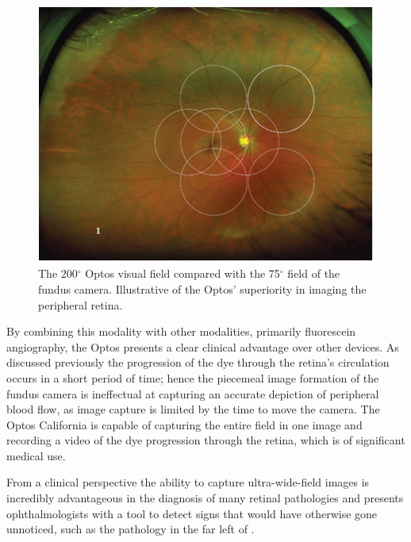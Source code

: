 \begin{figure}[H]
\centering
\includegraphics{figures/uwfvs}
\caption{The 200$^\circ$ Optos visual field compared with the 75$^\circ$ field of the fundus camera. Illustrative of the Optos' superiority in imaging the peripheral retina.\cite{1_optos.com_2015}}
\label{fig:uwfvs}
   \end{figure}

By combining this modality with other modalities, primarily fluorescein
angiography, the Optos presents a clear clinical advantage over other
devices. As discussed previously the progression of the dye through the
retina's circulation occurs in a short period of time; hence the piecemeal
image formation of the fundus camera is ineffectual at capturing an accurate
depiction of peripheral blood flow, as image capture is limited by the time
to move the camera. The Optos California is capable of capturing the entire
field in one image and recording a video of the dye progression through the
retina, which is of significant medical use.

From a clinical perspective the ability to capture ultra-wide-field images
is incredibly advantageous in the diagnosis of many retinal pathologies
\cite{6_witmer_kozbial_daniel_kiss_2012} and presents ophthalmologists
with a tool to detect signs that would have otherwise gone unnoticed, such
as the pathology in the far left of .

